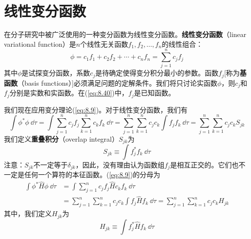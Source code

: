 \section{线性变分函数}
\label{sec:8.5 Linear Variational Functions}
    在分子研究中被广泛使用的一种变分函数为线性变分函数。\textbf{线性变分函数}（linear variational function）是$n$个线性无关函数$f_1,f_2,\ldots,f_n$的线性组合：
    \begin{equation}
        \phi = c_1f_1 + c_2f_2 + \cdots + c_nf_n = \sum_{j=1}^{n}c_jf_j
        \label{eq:8.40}
    \end{equation}
    其中$\phi$是试探变分函数，系数$c_j$是待确定使得变分积分最小的参数。函数$f_j$[称为\textbf{基函数}（basis functions）]必须满足问题的定解条件。我们将只讨论实函数$\phi$，则$c_j$和$f_j$分别是实数和实函数。在(\ref{eq:8.40})中，$f_j$是已知函数。

    我们现在应用变分理论(\ref{eq:8.9})。对于线性变分函数，我们有
    \begin{equation}
        \int \phi^{\ast} \phi \: \dd \tau = \int \sum_{j=1}^{n}c_jf_j \sum_{k=1}^{n}c_kf_k\:\dd \tau = \sum_{j=1}^{n}\sum_{k=1}^{n}c_jc_k\int f_jf_k \: \dd \tau = \sum_{j=1}^{n}\sum_{k=1}^{n}c_jc_kS_{jk}
        \label{eq:8.41}
    \end{equation}
    我们定义\textbf{重叠积分}（overlap integral）$S_{jk}$为
    \begin{equation}
        \boxed{
            S_{jk} \equiv \int f_j^{\ast}f_k \: \dd \tau
        }
        \label{eq:8.42}
    \end{equation}
    注意：$S_{jk}$不一定等于$\delta_{jk}$，因此，没有理由认为函数组$f_j$是相互正交的。它们也不一定是任何一个算符的本征函数。(\ref{eq:8.9})的分母为
    \begin{equation*}
        \begin{aligned}
            \int \phi^{\ast} \hat{H} \phi\:\dd \tau &= \int \sum_{j=1}^{n}c_jf_j\hat{H}c_kf_k\:\dd \tau \\
            &= \sum_{j=1}^{n}\sum_{k=1}^{n}c_jc_k\int f_j\hat{H}f_k\:\dd \tau = \sum_{j=1}^{n}\sum_{k=1}^{n}c_jc_kH_{jk}
        \end{aligned}
    \end{equation*}
    其中，我们定义$H_{jk}$为
    \begin{equation}
        \boxed{
            H_{jk} \equiv \int f_j^{\ast}\hat{H}f_k \: \dd \tau
        }
        \label{eq:8.43}
    \end{equation}

